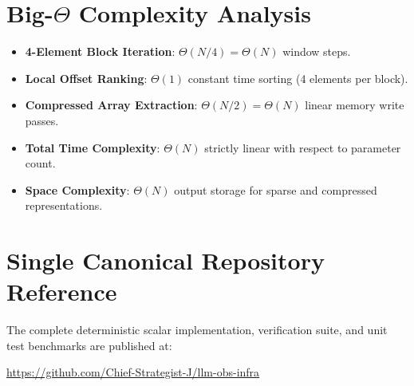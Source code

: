 \documentclass[11pt,a4paper]{article}
\theoremstyle{definition}
\begin{document}
\section{Big-$\Theta$ Complexity Analysis}

\begin{itemize}
    \item \textbf{4-Element Block Iteration}: $\Theta(N/4) = \Theta(N)$ window steps.
    \item \textbf{Local Offset Ranking}: $\Theta(1)$ constant time sorting (4 elements per block).
    \item \textbf{Compressed Array Extraction}: $\Theta(N/2) = \Theta(N)$ linear memory write passes.
    \item \textbf{Total Time Complexity}: $\Theta(N)$ strictly linear with respect to parameter count.
    \item \textbf{Space Complexity}: $\Theta(N)$ output storage for sparse and compressed representations.
\end{itemize}

\section{Single Canonical Repository Reference}

The complete deterministic scalar implementation, verification suite, and unit test benchmarks are published at:
\begin{center}
\url{https://github.com/Chief-Strategist-J/llm-obs-infra}
\end{center}
\end{document}
